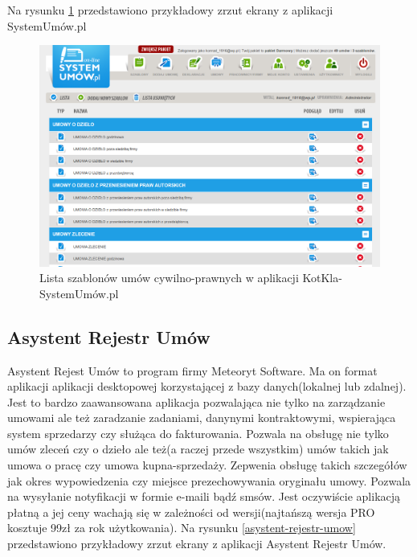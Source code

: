 Na rysunku \ref{kotkla-systemumow} przedstawiono przykładowy zrzut ekrany z aplikacji SystemUmów.pl

\begin{figure}[tdh]
    \begin{center}
	\includegraphics[scale=.4]{img/kotkla-systemumow.png}
	\caption{Lista szablonów umów cywilno-prawnych w aplikacji KotKla-SystemUmów.pl}
	\label{kotkla-systemumow}
    \end{center}
\end{figure}

\subsection[Asystent Rejestr Umów][Asystent Rejestr Umów]{Asystent Rejestr Umów}
Asystent Rejest Umów to program firmy Meteoryt Software. Ma on format aplikacji aplikacji desktopowej korzystającej z bazy danych(lokalnej lub zdalnej). Jest to bardzo zaawansowana aplikacja pozwalająca nie tylko na zarządzanie umowami ale też zaradzanie zadaniami, danynymi kontraktowymi, wspierająca system sprzedarzy czy służąca do fakturowania. Pozwala na obsługę nie tylko umów zleceń czy o dzieło ale też(a raczej przede wszystkim) umów takich jak umowa o pracę czy umowa kupna-sprzedaży. Zepwenia obsługę takich szczegółów jak okres wypowiedzenia czy miejsce prezechowywania oryginału umowy. Pozwala na wysyłanie notyfikacji w formie e-maili bądź smsów. Jest oczywiście aplikacją płatną a jej ceny wachają się w zależności od wersji(najtańszą wersja PRO kosztuje 99zł za rok użytkowania). Na rysunku \ref{asystent-rejestr-umow} przedstawiono przykładowy zrzut ekrany z aplikacji Asystent Rejestr Umów.

